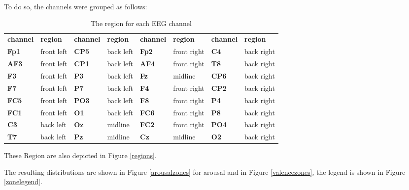 \npar
To do so, the channels were grouped as follows: 
\begin{table}[H]
\centering
\begin{tabular}{ll|ll|ll|ll}
\textbf{channel} & \textbf{region} & \textbf{channel} & \textbf{region} & \textbf{channel} & \textbf{region}      & \textbf{channel} & \textbf{region}     \\
\textbf{Fp1}     & front left      & \textbf{CP5}     & back left       & \textbf{Fp2}     & front right & \textbf{C4}      & back right \\
\textbf{AF3}     & front left      & \textbf{CP1}     & back left       & \textbf{AF4}     & front right & \textbf{T8}      & back right \\
\textbf{F3}      & front left      & \textbf{P3}      & back left       & \textbf{Fz}      & midline     & \textbf{CP6}     & back right \\
\textbf{F7}      & front left      & \textbf{P7}      & back left       & \textbf{F4}      & front right & \textbf{CP2}     & back right \\
\textbf{FC5}     & front left      & \textbf{PO3}     & back left       & \textbf{F8}      & front right & \textbf{P4}      & back right \\
\textbf{FC1}     & front left      & \textbf{O1}      & back left       & \textbf{FC6}     & front right & \textbf{P8}      & back right \\
\textbf{C3}      & back left       & \textbf{Oz}      & midline         & \textbf{FC2}     & front right & \textbf{PO4}     & back right \\
\textbf{T7}      & back left       & \textbf{Pz}      & midline         & \textbf{Cz}      & midline     & \textbf{O2}      & back right
\end{tabular}
\caption{The region for each EEG channel}
\end{table}

These Region are also depicted in Figure \ref{regions}.

The resulting distributions are shown in Figure \ref{arousalzones} for arousal and in Figure \ref{valencezones}, the legend is shown in Figure \ref{zonelegend}.

